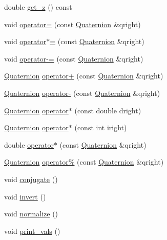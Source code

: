 \begin{DoxyCompactItemize}
\item 
double \mbox{\hyperlink{class_quaternion_a06bbdf496cde0892c8abaa2c9ccb7303}{get\+\_\+z}} () const
\item 
void \mbox{\hyperlink{class_quaternion_a9d1803735257db933e01e7a6fa909d1a}{operator=}} (const \mbox{\hyperlink{class_quaternion}{Quaternion}} \&qright)
\item 
void \mbox{\hyperlink{class_quaternion_a160196d3cffa9c26238a6967c83e4105}{operator$\ast$=}} (const \mbox{\hyperlink{class_quaternion}{Quaternion}} \&qright)
\item 
void \mbox{\hyperlink{class_quaternion_a207f0b200490590613f429d688fab593}{operator-\/=}} (const \mbox{\hyperlink{class_quaternion}{Quaternion}} \&qright)
\item 
\mbox{\hyperlink{class_quaternion}{Quaternion}} \mbox{\hyperlink{class_quaternion_ad1b6e783630601d29473d712cf8aa6ea}{operator+}} (const \mbox{\hyperlink{class_quaternion}{Quaternion}} \&qright)
\item 
\mbox{\hyperlink{class_quaternion}{Quaternion}} \mbox{\hyperlink{class_quaternion_a18d7f575a9b46a21034fc3aae73c9c82}{operator-\/}} (const \mbox{\hyperlink{class_quaternion}{Quaternion}} \&qright)
\item 
\mbox{\hyperlink{class_quaternion}{Quaternion}} \mbox{\hyperlink{class_quaternion_a4b73b74aac843b8163e04c24b1c9bd69}{operator$\ast$}} (const double dright)
\item 
\mbox{\hyperlink{class_quaternion}{Quaternion}} \mbox{\hyperlink{class_quaternion_afd7dca9b83120d04f030f49a24cdcc25}{operator$\ast$}} (const int iright)
\item 
double \mbox{\hyperlink{class_quaternion_a21b49530f9869f4648dc31bdc5adf3dd}{operator$\ast$}} (const \mbox{\hyperlink{class_quaternion}{Quaternion}} \&qright)
\item 
\mbox{\hyperlink{class_quaternion}{Quaternion}} \mbox{\hyperlink{class_quaternion_a18d6d5dc6431906a5aa1e2bcfc4be310}{operator\%}} (const \mbox{\hyperlink{class_quaternion}{Quaternion}} \&qright)
\item 
void \mbox{\hyperlink{class_quaternion_ae387bec8f394bdc58a5ac1480f11140f}{conjugate}} ()
\item 
void \mbox{\hyperlink{class_quaternion_af412b81da68a27d6e5c259614f8e5fd3}{invert}} ()
\item 
void \mbox{\hyperlink{class_quaternion_a48e6bafb249c895ed25f29dc9170e11e}{normalize}} ()
\item 
void \mbox{\hyperlink{class_quaternion_a6e39640890bd66e0d3ab8142b3773140}{print\+\_\+vals}} ()
\end{DoxyCompactItemize}


